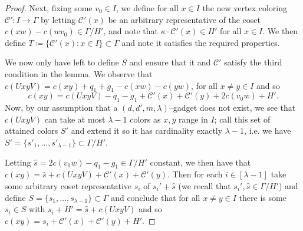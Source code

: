 \documentclass[10pt,a4paper]{amsart}
\newcommand{\cC}{\mathcal{C} }
\begin{document}
\begin{proof}
Next, fixing some $v_0\in I$, we define for all $x\in I$ the new vertex coloring $\cC':I\to\Gamma$ by letting $\cC'(x)$ be an arbitrary representative of the coset $c(xw)-c(wv_0)\in \Gamma/H'$, and note that $\kappa \cdot \cC'(x)\in H'$ for all $x\in I$. We then define $T\coloneqq \{\cC'(x):x\in I\}\subset \Gamma$ and note it satisfies the required properties.

We now only have left to define $S$ and ensure that it and $\cC'$ satisfy the third condition in the lemma. We observe that $c(UxyV)=c(xy)+q_1+g_1-c(xw)-c(yw)$, for all $x\neq y\in I$ and so
\[c(xy)=c(UxyV) -q_1-g_1+\cC'(x)+\cC'(y)+2c(v_0w)+H'.\] 
Now, by our assumption that a $(d,d',m,\lambda)$--gadget does not exist, we see that $c(UxyV)$ can take at most $\lambda-1$ colors as $x, y$ range in $I$; call this set of attained colors $S'$ and extend it so it has cardinality exactly $\lambda-1$, i.e. we have $S'=\{s'_1, \dots, s'_{\lambda-1}\}\subset \Gamma/H'$.

Letting $\hat{s}= 2c(v_0w)-q_1-g_1\in \Gamma/H'$ constant, we then have that $c(xy)=\hat{s}+c(UxyV)+\cC'(x)+\cC'(y)$. Then for each $i\in [\lambda-1]$ take some arbitrary coset representative $s_i$ of $s_i' + \hat{s}$ (we recall that $s_i', \hat{s}\in \Gamma/H'$) and define $S=\{s_1,\ldots,s_{\lambda-1}\}\subset \Gamma$ and conclude that for all $x\neq y\in I$ there is some $s_i\in S$ with $s_i+H'=\hat{s}+c(UxyV)$ and so  $c(xy)=s_i+\cC'(x)+\cC'(y)+H'$.
\end{proof}
\end{document}

